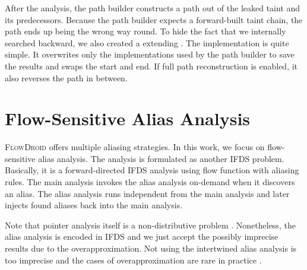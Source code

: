 \documentclass[../draft.tex]{subfiles}
\begin{document}
    After the analysis, the path builder constructs a path out of the leaked taint and its predecessors. 
    Because the path builder expects a forward-built taint chain, the path ends up being the wrong way round. 
    To hide the fact that we internally searched backward, we also created a  extending . 
    The implementation is quite simple. 
    It overwrites only the  implementations used by the path builder to save the results and swaps the start and end. 
    If full path reconstruction is enabled, it also reverses the path in between.

    \section{Flow-Sensitive Alias Analysis}\label{s:aliasing}
    \textsc{FlowDroid} offers multiple aliasing strategies.
    In this work, we focus on flow-sensitive alias analysis. 
    The analysis is formulated as another IFDS problem. 
    Basically, it is a forward-directed IFDS analysis using flow function with aliasing rules. 
    The main analysis invokes the alias analysis on-demand when it discovers an alias.
    The alias analysis runs independent from the main analysis and later injects found aliases back into the main analysis.

    Note that pointer analysis itself is a non-distributive problem \cite{Arzt2017PhD, Spaeth2016}. 
    Nonetheless, the alias analysis is encoded in IFDS and we just accept the possibly imprecise results due to the overapproximation. 
    Not using the intertwined alias analysis is too imprecise and the cases of overapproximation are rare in practice \cite{Arzt2017PhD}.
\end{document}
